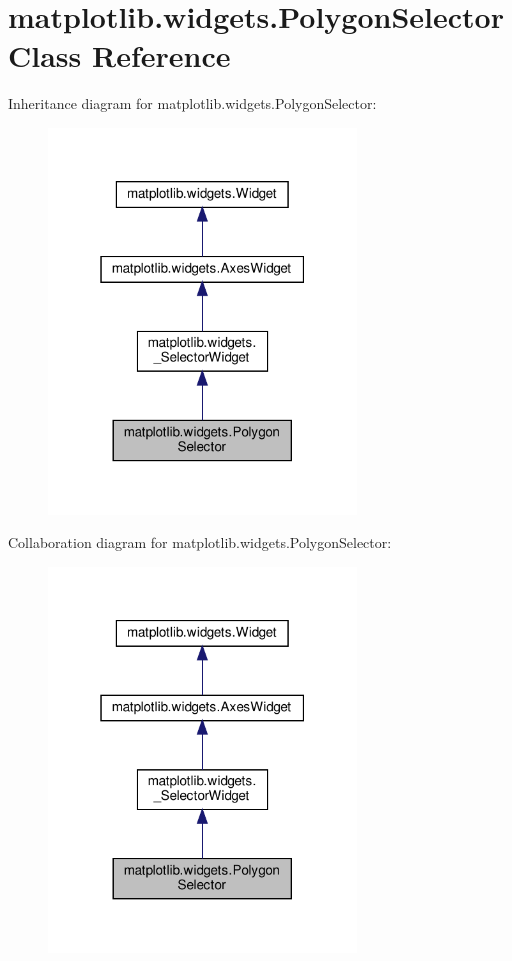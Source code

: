 \hypertarget{classmatplotlib_1_1widgets_1_1PolygonSelector}{}\section{matplotlib.\+widgets.\+Polygon\+Selector Class Reference}
\label{classmatplotlib_1_1widgets_1_1PolygonSelector}


Inheritance diagram for matplotlib.\+widgets.\+Polygon\+Selector\+:
\nopagebreak
\begin{figure}[H]
\begin{center}
\leavevmode
\includegraphics[width=232pt]{classmatplotlib_1_1widgets_1_1PolygonSelector__inherit__graph}
\end{center}
\end{figure}


Collaboration diagram for matplotlib.\+widgets.\+Polygon\+Selector\+:
\nopagebreak
\begin{figure}[H]
\begin{center}
\leavevmode
\includegraphics[width=232pt]{classmatplotlib_1_1widgets_1_1PolygonSelector__coll__graph}
\end{center}
\end{figure}
